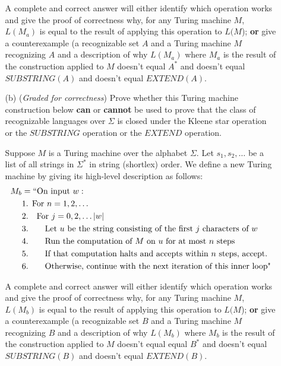 \documentclass[12pt, oneside]{article}
\newcommand{\gradeCorrect}{({\it Graded for correctness}) }
\begin{document}
\begin{enumerate}[wide, labelwidth=!, labelindent=0pt]
\begin{enumerate}
A complete and correct answer will either identify which operation works and give the proof of correctness why, for any Turing machine $M$, $L(M_{a})$ is equal to the result of applying this operation to $L(M$); {\bf or} give a counterexample (a recognizable set $A$ and a Turing machine $M$ recognizing $A$
and a description of why $L(M_a)$ where $M_a$ is the result of the construction 
applied to $M$ doesn't equal $A^*$ and doesn't equal $SUBSTRING(A)$ and doesn't equal $EXTEND(A)$.

\item[(b)]\gradeCorrect Prove whether this Turing machine construction below 
{\bf can} or {\bf cannot} be used to prove that the
class of recognizable languages over $\Sigma$ is closed under the 
Kleene star operation or the $SUBSTRING$ operation or the $EXTEND$ operation.

Suppose $M$ is a Turing machine over the alphabet $\Sigma$. 
Let $s_1, s_2, \ldots$ be a list of all strings in 
$\Sigma^*$ in string (shortlex) order.
We define a new Turing machine
by giving its high-level description as follows: 
\begin{align*}
    M_{b} &= ``\text{On input }w:\\
     &\text{1. For $n = 1, 2, \ldots$}\\
     &\text{2.~~~For $j = 0, 2, \ldots |w|$} \\
     &\text{3.~~~~~~Let $u$ be the string consisting of the first $j$ characters of $w$} \\
     &\text{4.~~~~~~Run the computation of $M$ on $u$ for at most $n$ steps}\\
     &\text{5.~~~~~~If that computation halts and accepts within $n$ steps, accept.}\\
     &\text{6.~~~~~~Otherwise, continue with the next iteration of this inner loop"}\\
 \end{align*}

A complete and correct answer will either identify which operation works and give the proof of correctness why, for any Turing machine $M$, $L(M_{b})$ is equal to the result of applying this operation to $L(M$); {\bf or} give a counterexample (a recognizable set $B$ and a Turing machine $M$ recognizing $B$
and a description of why $L(M_b)$ where $M_b$ is the result of the construction 
applied to $M$ doesn't equal equal $B^*$ and doesn't equal $SUBSTRING(B)$ and doesn't equal $EXTEND(B)$.
\end{enumerate}


\end{enumerate}
\end{document}
